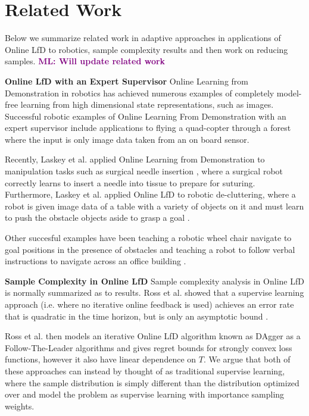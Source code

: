 \documentclass[10pt, conference]{ieeeconf}      %
\newcommand{\mlnote}[1]{\ifthenelse{ \boolean{include-notes}}%
 {\textcolor{purple}{\textbf{ML: #1}}}{}}
\begin{document}
\section{Related Work}
Below we summarize related work in adaptive approaches in applications of Online LfD to robotics, sample complexity results and then work on reducing samples. \mlnote{Will update related work}


\noindent \textbf{Online LfD with an Expert Supervisor}
Online Learning from Demonstration in robotics has achieved numerous examples of completely model-free learning from high dimensional state representations, such as images. Successful robotic examples of Online Learning From Demonstration with an expert supervisor include applications to flying a quad-copter through a forest where the input is only image data taken from an on board sensor. 

Recently, Laskey et al. applied Online Learning from Demonstration to manipulation tasks such as surgical needle insertion \cite{laskeyshiv}, where a surgical robot correctly learns to insert a needle into tissue to prepare for suturing. Furthermore, Laskey et al. applied Online LfD to robotic de-cluttering, where a robot is given image data of a table with a variety of objects on it and must learn to push the obstacle objects aside to grasp a goal \cite{laskeyrobot}. 

Other succesful examples have been teaching a robotic wheel chair navigate to goal positions in the presence of obstacles and teaching a robot to follow verbal instructions to navigate across an office building \cite{kim2013maximum, duvallet2013imitation}. 

\noindent \textbf{Sample Complexity in Online LfD}
Sample complexity analysis in Online LfD is normally summarized as to results.  Ross et al. showed that a supervise learning approach (i.e. where no iterative online feedback is used) achieves an error rate that is quadratic in the time horizon, but is only an asymptotic bound \cite{ross2010efficient}. 

Ross et al. then models an iterative Online LfD algorithm known as DAgger as a Follow-The-Leader algorithms and gives regret bounds for strongly convex loss functions, however it also have linear dependence on $T$. We argue that both of these approaches can instead by thought of as traditional supervise learning, where the sample distribution is simply different than the distribution optimized over and model the problem as supervise learning with importance sampling weights. 
\end{document}
